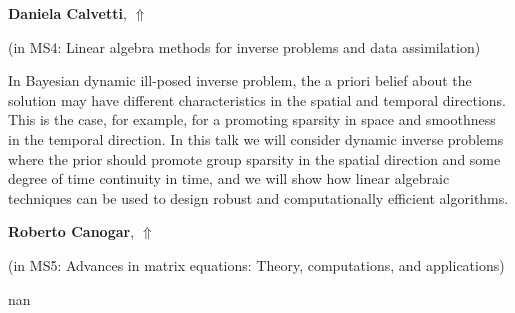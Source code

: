 \documentclass[ILAS2025-program.tex]{subfiles}
\begin{document}
     \hypertarget{down0311}{}\begin{ilasabstract}
    
    \textbf{Daniela Calvetti},  \hfill \hyperlink{up0311}{$\Uparrow$}
    
    (in {\color{mstitle}MS4: Linear algebra methods for inverse problems and data assimilation})
        
        \mtskip
    In Bayesian dynamic ill-posed inverse problem, the a priori belief about the solution may have different characteristics in the spatial and temporal directions.  This is the case, for example, for a  promoting sparsity in space  and  smoothness in the temporal direction. In this talk we will consider dynamic inverse problems where the prior should promote group sparsity  in the spatial direction and some degree of time continuity in time, and we will show how linear algebraic techniques can be used to design robust and computationally efficient algorithms. 
\end{ilasabstract}
     \hypertarget{down0320}{}\begin{ilasabstract}
    
    \textbf{Roberto Canogar},  \hfill \hyperlink{up0320}{$\Uparrow$}
    
    (in {\color{mstitle}MS5: Advances in matrix equations: Theory, computations, and applications})
        
        \mtskip
    nan\end{ilasabstract}
\end{document}
